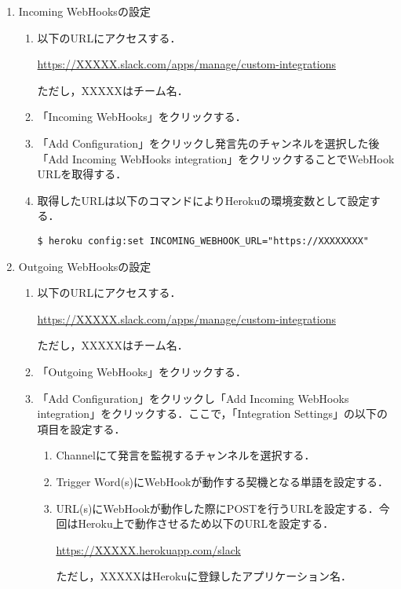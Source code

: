 \documentclass[fleqn, 14pt]{extarticlej}
\begin{document}
\begin{enumerate}
\item Incoming WebHooksの設定
  
  \begin{enumerate}
  \item 以下のURLにアクセスする．
    
    \url{https://XXXXX.slack.com/apps/manage/custom-integrations}

    ただし，XXXXXはチーム名．
    
  \item 「Incoming WebHooks」をクリックする．
  \item 「Add Configuration」をクリックし発言先のチャンネルを選択した後「Add Incoming WebHooks integration」をクリックすることでWebHook URLを取得する．
  \item 取得したURLは以下のコマンドによりHerokuの環境変数として設定する．

    \verb|$ heroku config:set INCOMING_WEBHOOK_URL="https://XXXXXXXX"| 
  \end{enumerate}
\item Outgoing WebHooksの設定
  
  \begin{enumerate}
  \item 以下のURLにアクセスする．
    
    \url{https://XXXXX.slack.com/apps/manage/custom-integrations}

    ただし，XXXXXはチーム名．
    
  \item 「Outgoing WebHooks」をクリックする．
  \item 「Add Configuration」をクリックし「Add Incoming WebHooks integration」をクリックする．ここで，「Integration Settings」の以下の項目を設定する．
    \begin{enumerate}
    \item Channelにて発言を監視するチャンネルを選択する．
    \item Trigger Word(s)にWebHookが動作する契機となる単語を設定する．
    \item URL(s)にWebHookが動作した際にPOSTを行うURLを設定する．今回はHeroku上で動作させるため以下のURLを設定する．

      \url{https://XXXXX.herokuapp.com/slack}
      
      ただし，XXXXXはHerokuに登録したアプリケーション名．
    \end{enumerate}
  \end{enumerate}
\end{enumerate}
\end{document}
